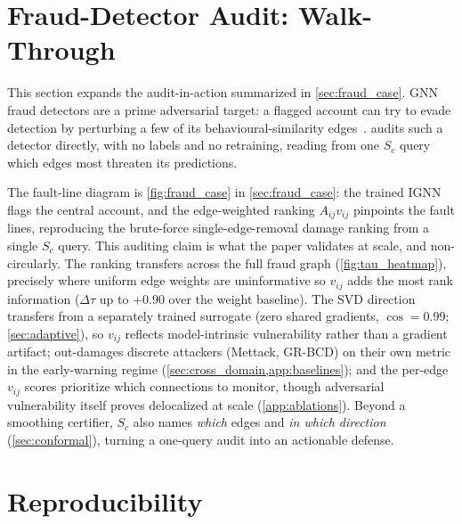\section{Fraud-Detector Audit: Walk-Through}
\label{app:fraud}

This section expands the audit-in-action summarized in \cref{sec:fraud_case}. GNN fraud detectors are a
prime adversarial target: a flagged account can try to evade detection by perturbing a few of its
behavioural-similarity edges~\cite{zugner2018adversarial,dou2020enhancing}. \AEGIS audits such a detector
directly, with no labels and no retraining, reading from one $S_c$ query which edges most threaten its
predictions.

The fault-line diagram is \cref{fig:fraud_case} in \cref{sec:fraud_case}: the trained IGNN flags the
central account, and the edge-weighted ranking $A_{ij}v_{ij}$ pinpoints the fault lines, reproducing the
brute-force single-edge-removal damage ranking from a single $S_c$ query. This auditing claim is what the
paper validates at scale, and non-circularly. The ranking transfers across the full fraud graph
(\cref{fig:tau_heatmap}), precisely where uniform edge weights are uninformative so $v_{ij}$ adds the
most rank information ($\Delta\tau$ up to $\mathbf{+0.90}$ over the weight baseline). The SVD direction
transfers from a separately trained surrogate (zero shared gradients, $\cos{=}0.99$;
\cref{sec:adaptive}), so $v_{ij}$ reflects model-intrinsic vulnerability rather than a gradient
artifact; \AEGIS out-damages discrete attackers (Mettack, GR-BCD) on their own metric in the
early-warning regime (\cref{sec:cross_domain,app:baselines}); and the per-edge $v_{ij}$ scores prioritize
which connections to monitor, though adversarial vulnerability itself proves delocalized at scale
(\cref{app:ablations}). Beyond a smoothing certifier, $S_c$ also names \emph{which} edges and \emph{in
which direction} (\cref{sec:conformal}), turning a one-query audit into an actionable defense.

\section{Reproducibility}
\label{app:repro}


